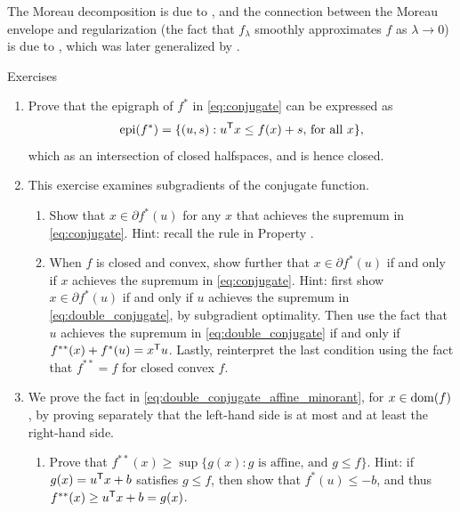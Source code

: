 The Moreau decomposition is due to \cite{moreau1962fonctions,
  moreau1965proximite}, and the connection between the Moreau envelope and
regularization (the fact that $f_\lambda$ smoothly approximates $f$ as $\lambda
\to 0$) is due to \cite{attouch1977convergence}, which was later generalized by 
\cite{attouch1981convergence}.   

\clearpage

\begin{xcb}{Exercises}
\begin{enumerate}[label=\thechapter.\arabic*]
\settowidth{\leftmargini}{0.00.\hskip\labelsep}
\item \label{ex:conjugate_closed}
  Prove that the epigraph of $f^*$ in \eqref{eq:conjugate} can be expressed as  
  \[
  \operatorname{epi}(f^*) = \{ (u,s) : u^{\mathsf{T}} x \leq f(x) + s, \, \text{for all $x$} \},
  \]
  which as an intersection of closed halfspaces, and is hence closed. 

\item \label{ex:conjugate_subgradients}
  This exercise examines subgradients of the conjugate function.

\begin{enumerate}[label=\alph*.]
\item Show that $x \in \partial f^*(u)$ for any $x$ that achieves the supremum
  in \eqref{eq:conjugate}. Hint: recall the rule in Property
  . 

\item When $f$ is closed and convex, show further that $x \in \partial f^*(u)$
  if and only if $x$ achieves the supremum in \eqref{eq:conjugate}. Hint: first
  show $x \in \partial f^*(u)$ if and only if $u$ achieves the supremum in
  \eqref{eq:double_conjugate}, by subgradient optimality. Then use the fact that
  $u$ achieves the supremum in \eqref{eq:double_conjugate} if and only if
  $f^{**}(x) + f^*(u) = x^{\mathsf{T}} u$. Lastly, reinterpret the last condition using
  the fact that $f^{**} = f$ for closed convex $f$. 
\end{enumerate}

\item \label{ex:double_conjugate_affine_minorant}
  We prove the fact in \eqref{eq:double_conjugate_affine_minorant}, for $x \in
  \operatorname{dom}(f)$, by proving separately that the left-hand side is at most and at
  least the right-hand side.     

\begin{enumerate}[label=\alph*.]
\item Prove that $f^{**}(x) \geq \sup \{ g(x) : \text{$g$ is affine, and $g \leq
    f$} \}$. Hint: if $g(x) = u^{\mathsf{T}} x + b$ satisfies $g \leq f$, then show that
  $f^*(u) \leq -b$, and thus $f^{**}(x) \geq u^{\mathsf{T}} x + b = g(x)$. 
  

\end{enumerate}
\end{enumerate}
\end{xcb}
